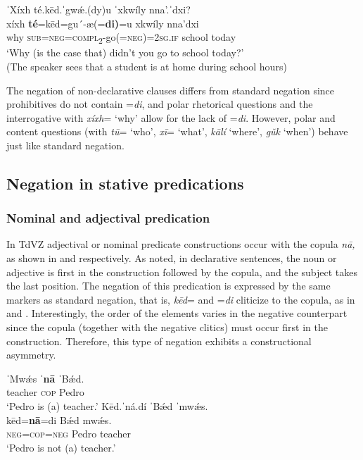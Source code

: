 \documentclass[output=paper,colorlinks=true, citecolor=brown]{langscibook}
\begin{document}
\ea\label{ex:zap:36} 
    \glll ˈXíxh té.kēd.ˈgwǽ.(dy)u ˈxkwíly nna’.ˈdxi?\\ 
          xíxh \textbf{té}=kēd=gu´-æ(=\textbf{di)}=u xkwíly nna’dxi\\
          why \textsc{sub}=\textsc{neg}=\textsc{compl}\textsc{\textsubscript{2}}{}-go(=\textsc{neg})=\textsc{2sg.if} school today\\
    \glt ‘Why (is the case that) didn’t you go to school today?’\\
    (The speaker sees that a student is at home during school hours)
\z 

The negation of non-declarative clauses differs from standard negation since prohibitives do not contain =\textit{di}, and polar rhetorical questions and the interrogative with \textit{xíxh}= ‘why’ allow for the lack of =\textit{di}. However, polar and content questions (with \textit{tū}= ‘who’, \textit{xī}= ‘what’, \textit{kālí} ‘where’, \textit{gǔk} ‘when’) behave just like standard negation.

\subsection{Negation in stative predications}\label{sec:zap:2.3}
\subsubsection{Nominal and adjectival predication}\label{sec:zap:2.3.1}

In TdVZ adjectival or nominal predicate constructions occur with the copula \textit{nā,} as shown in  and  respectively. As noted, in declarative sentences, the noun or adjective is first in the construction followed by the copula, and the subject takes the last position. The negation of this predication is expressed by the same markers as standard negation, that is, \textit{kēd}= and =\textit{di} cliticize to the copula, as in  and . Interestingly, the order of the elements varies in the negative counterpart since the copula (together with the negative clitics) must occur first in the construction. Therefore, this type of negation exhibits a constructional asymmetry.

\ea\label{ex:zap:37}
    \ea\label{ex:zap:37a}
        \gll  ˈMwǽs ˈ\textbf{nā} ˈBǽd. \\ 
              teacher \textsc{cop} Pedro\\
        \glt  ‘Pedro is (a) teacher.’
    \ex\label{ex:zap:37b}
        \glll  Kēd.ˈná.dí ˈBǽd ˈmwǽs.\\
                kēd=\textbf{nā}=di Bǽd mwǽs.\\
                \textsc{neg}=\textsc{cop}=\textsc{neg} Pedro teacher\\
        \glt ‘Pedro is not (a) teacher.’
    \z
\z 
\end{document}
